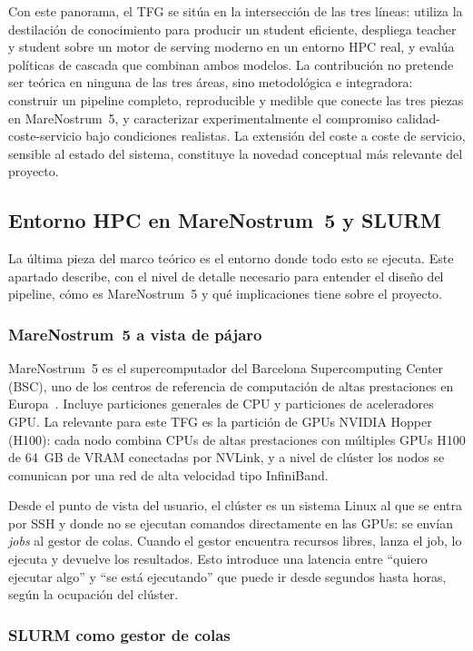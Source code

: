 Con este panorama, el TFG se sitúa en la intersección de las tres líneas: utiliza la destilación de conocimiento para producir un student eficiente, despliega teacher y student sobre un motor de serving moderno en un entorno HPC real, y evalúa políticas de cascada que combinan ambos modelos. La contribución no pretende ser teórica en ninguna de las tres áreas, sino metodológica e integradora: construir un pipeline completo, reproducible y medible que conecte las tres piezas en MareNostrum~5, y caracterizar experimentalmente el compromiso calidad-coste-servicio bajo condiciones realistas. La extensión del coste a coste de servicio, sensible al estado del sistema, constituye la novedad conceptual más relevante del proyecto.

\subsection{Entorno HPC en MareNostrum~5 y SLURM}

La última pieza del marco teórico es el entorno donde todo esto se ejecuta. Este apartado describe, con el nivel de detalle necesario para entender el diseño del pipeline, cómo es MareNostrum~5 y qué implicaciones tiene sobre el proyecto.

\subsubsection{MareNostrum~5 a vista de pájaro}

MareNostrum~5 es el supercomputador del Barcelona Supercomputing Center (BSC), uno de los centros de referencia de computación de altas prestaciones en Europa~\cite{mn5}. Incluye particiones generales de CPU y particiones de aceleradores GPU. La relevante para este TFG es la partición de GPUs NVIDIA Hopper (H100): cada nodo combina CPUs de altas prestaciones con múltiples GPUs H100 de 64~GB de VRAM conectadas por NVLink, y a nivel de clúster los nodos se comunican por una red de alta velocidad tipo InfiniBand.

Desde el punto de vista del usuario, el clúster es un sistema Linux al que se entra por SSH y donde no se ejecutan comandos directamente en las GPUs: se envían \textit{jobs} al gestor de colas. Cuando el gestor encuentra recursos libres, lanza el job, lo ejecuta y devuelve los resultados. Esto introduce una latencia entre ``quiero ejecutar algo'' y ``se está ejecutando'' que puede ir desde segundos hasta horas, según la ocupación del clúster.

\subsubsection{SLURM como gestor de colas}

